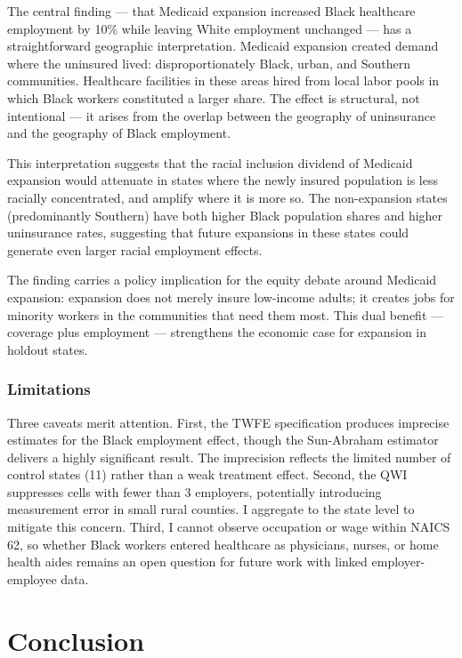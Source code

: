 \documentclass[12pt]{article}
\begin{document}
The central finding --- that Medicaid expansion increased Black healthcare employment by 10\% while leaving White employment unchanged --- has a straightforward geographic interpretation. Medicaid expansion created demand where the uninsured lived: disproportionately Black, urban, and Southern communities. Healthcare facilities in these areas hired from local labor pools in which Black workers constituted a larger share. The effect is structural, not intentional --- it arises from the overlap between the geography of uninsurance and the geography of Black employment.

This interpretation suggests that the racial inclusion dividend of Medicaid expansion would attenuate in states where the newly insured population is less racially concentrated, and amplify where it is more so. The non-expansion states (predominantly Southern) have both higher Black population shares and higher uninsurance rates, suggesting that future expansions in these states could generate even larger racial employment effects.

The finding carries a policy implication for the equity debate around Medicaid expansion: expansion does not merely insure low-income adults; it creates jobs for minority workers in the communities that need them most. This dual benefit --- coverage plus employment --- strengthens the economic case for expansion in holdout states.

\subsubsection*{Limitations} Three caveats merit attention. First, the TWFE specification produces imprecise estimates for the Black employment effect, though the Sun-Abraham estimator delivers a highly significant result. The imprecision reflects the limited number of control states (11) rather than a weak treatment effect. Second, the QWI suppresses cells with fewer than 3 employers, potentially introducing measurement error in small rural counties. I aggregate to the state level to mitigate this concern. Third, I cannot observe occupation or wage within NAICS 62, so whether Black workers entered healthcare as physicians, nurses, or home health aides remains an open question for future work with linked employer-employee data.

\section{Conclusion}
\end{document}
